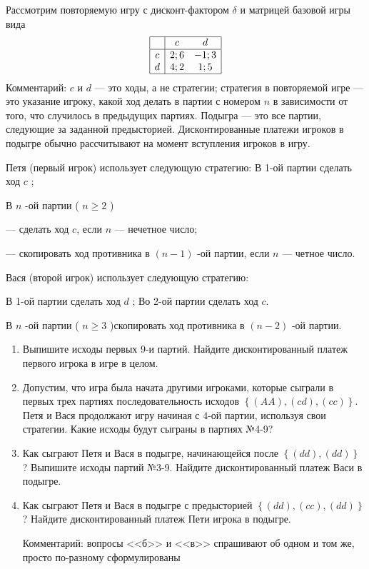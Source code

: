 \begin{problem}

Рассмотрим повторяемую игру с дисконт-фактором  $\delta $  и матрицей базовой игры вида
\[\begin{array}{|c|cc|}  \hline {} & {c} & {d} \\  \hline {c} & {2;6} & {-1;3} \\ {d} & {4;2} & {1;5} \\  \hline  \end{array}\]
Комментарий:  $c$  и  $d$  --- это ходы, а не стратегии; стратегия в повторяемой игре --- это указание игроку, какой ход делать в партии с номером  $n$  в зависимости от того, что случилось в предыдущих партиях.
Подыгра --- это все партии, следующие за заданной предысторией. Дисконтированные платежи игроков в подыгре обычно рассчитывают на момент вступления игроков в игру.\par
Петя (первый игрок) использует следующую стратегию:
В 1-ой партии сделать ход  $c$ ;\par
В  $n$ -ой партии ( $n\ge 2$ )\par
       --- сделать ход  $c$, если  $n$  --- нечетное число;\par
       --- скопировать ход противника в  $\left(n-1\right)$ -ой партии, если  $n$  --- четное число.\par
Вася (второй игрок) использует следующую стратегию:\par
В 1-ой партии сделать ход  $d$ ; Во 2-ой партии сделать ход  $c$.\par
В  $n$ -ой партии ( $n\ge 3$ )скопировать ход противника в  $\left(n-2\right)$ -ой партии.\par
\begin{enumerate}
\item      Выпишите исходы первых 9-и партий. Найдите дисконтированный платеж первого игрока в игре в целом.\par
\item      Допустим, что игра была начата другими игроками, которые сыграли в первых трех партиях последовательность исходов  $\left\{\left(AA\right),\left(cd\right),\left(cc\right)\right\}$. Петя и Вася продолжают игру начиная с 4-ой партии, используя свои стратегии. Какие исходы будут сыграны в партиях №4-9?\par
\item       Как сыграют Петя и Вася в подыгре, начинающейся после  $\left\{\left(dd\right),\left(dd\right)\right\}$ ? Выпишите исходы партий №3-9. Найдите дисконтированный платеж Васи в подыгре.\par
\item      Как сыграют Петя и Вася в подыгре с предысторией  $\left\{\left(dd\right),\left(cc\right),\left(dd\right)\right\}$ ? Найдите дисконтированный платеж Пети игрока в подыгре.\par
Комментарий: вопросы <<б>> и <<в>> спрашивают об одном и том же, просто по-разному сформулированы
\end{enumerate}

\begin{sol}

\end{sol}
\end{problem}



